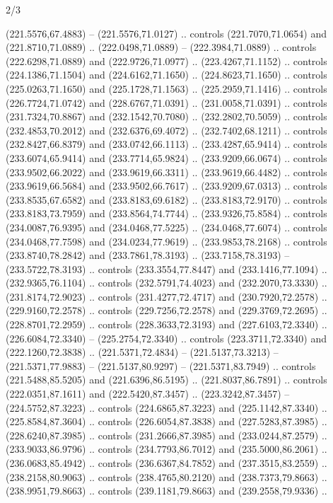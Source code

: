 \begin{flagdescription}{2/3}
\begin{scope}[xshift=0.5\flaglength,yshift=0.5\flagwidth,scale=\flagwidth/311.22]
\begin{scope}[y=0.8pt, x=0.8pt, yscale=-1,shift={(-291.77,-194.51)}]
  (221.5576,67.4883) -- (221.5576,71.0127) .. controls (221.7070,71.0654) and
  (221.8710,71.0889) .. (222.0498,71.0889) -- (222.3984,71.0889) .. controls
  (222.6298,71.0889) and (222.9726,71.0977) .. (223.4267,71.1152) .. controls
  (224.1386,71.1504) and (224.6162,71.1650) .. (224.8623,71.1650) .. controls
  (225.0263,71.1650) and (225.1728,71.1563) .. (225.2959,71.1416) .. controls
  (226.7724,71.0742) and (228.6767,71.0391) .. (231.0058,71.0391) .. controls
  (231.7324,70.8867) and (232.1542,70.7080) .. (232.2802,70.5059) .. controls
  (232.4853,70.2012) and (232.6376,69.4072) .. (232.7402,68.1211) .. controls
  (232.8427,66.8379) and (233.0742,66.1113) .. (233.4287,65.9414) .. controls
  (233.6074,65.9414) and (233.7714,65.9824) .. (233.9209,66.0674) .. controls
  (233.9502,66.2022) and (233.9619,66.3311) .. (233.9619,66.4482) .. controls
  (233.9619,66.5684) and (233.9502,66.7617) .. (233.9209,67.0313) .. controls
  (233.8535,67.6582) and (233.8183,69.6182) .. (233.8183,72.9170) .. controls
  (233.8183,73.7959) and (233.8564,74.7744) .. (233.9326,75.8584) .. controls
  (234.0087,76.9395) and (234.0468,77.5225) .. (234.0468,77.6074) .. controls
  (234.0468,77.7598) and (234.0234,77.9619) .. (233.9853,78.2168) .. controls
  (233.8740,78.2842) and (233.7861,78.3193) .. (233.7158,78.3193) --
  (233.5722,78.3193) .. controls (233.3554,77.8447) and (233.1416,77.1094) ..
  (232.9365,76.1104) .. controls (232.5791,74.4023) and (232.2070,73.3330) ..
  (231.8174,72.9023) .. controls (231.4277,72.4717) and (230.7920,72.2578) ..
  (229.9160,72.2578) .. controls (229.7256,72.2578) and (229.3769,72.2695) ..
  (228.8701,72.2959) .. controls (228.3633,72.3193) and (227.6103,72.3340) ..
  (226.6084,72.3340) -- (225.2754,72.3340) .. controls (223.3711,72.3340) and
  (222.1260,72.3838) .. (221.5371,72.4834) -- (221.5137,73.3213) --
  (221.5371,77.9883) -- (221.5137,80.9297) -- (221.5371,83.7949) .. controls
  (221.5488,85.5205) and (221.6396,86.5195) .. (221.8037,86.7891) .. controls
  (222.0351,87.1611) and (222.5420,87.3457) .. (223.3242,87.3457) --
  (224.5752,87.3223) .. controls (224.6865,87.3223) and (225.1142,87.3340) ..
  (225.8584,87.3604) .. controls (226.6054,87.3838) and (227.5283,87.3985) ..
  (228.6240,87.3985) .. controls (231.2666,87.3985) and (233.0244,87.2579) ..
  (233.9033,86.9796) .. controls (234.7793,86.7012) and (235.5000,86.2061) ..
  (236.0683,85.4942) .. controls (236.6367,84.7852) and (237.3515,83.2559) ..
  (238.2158,80.9063) .. controls (238.4765,80.2120) and (238.7373,79.8663) ..
  (238.9951,79.8663) .. controls (239.1181,79.8663) and (239.2558,79.9336) ..

\end{scope}
\end{scope}
\end{flagdescription}
